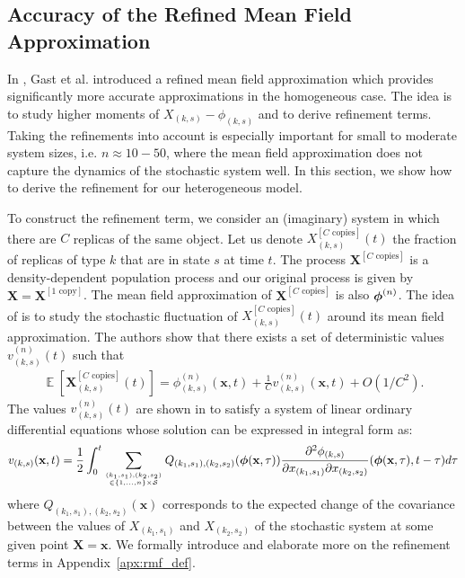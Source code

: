 \documentclass[acmsmall]{acmart}
\newcommand\bx{\mathbf{x}}
\newcommand\bX{\mathbf{X}}
\newcommand\bphi{\text{\boldmath$\phi$}}
\newcommand\calS{\mathcal{S}}
\newcommand\toN{^{(n)}}
\newcommand{\ncopies}{^{[C\text{ copies}]}}
\newcommand{\onecopy}{^{[1\text{ copy}]}}
\DeclareMathOperator{\E}{\mathbb{E}} %
\newcommand\esp[1]{\E\left[#1\right]} %
\newcommand{\dd}[3]{ \frac{\partial^2 #1 }{ \partial x_{#2} \partial x_{#3}}}
\begin{document}
\subsection{Accuracy of the Refined Mean Field Approximation}
\label{ssec:rmf:definition}
\color{myorange}
In \cite{gastSizeExpansionsMean2019,gastRefinedMeanField2017}, Gast et al. introduced a refined mean field approximation which provides significantly more accurate approximations in the homogeneous case. The idea is to study higher moments of $X_{(k,s)} - \phi_{(k,s)}$ and to derive refinement terms. Taking the refinements into account is especially important for small to moderate system sizes, i.e. $n\approx10-50$, where the mean field approximation does not capture the dynamics of the stochastic system well. In this section, we show how to derive the refinement for our heterogeneous model.

To construct the refinement term, we consider an (imaginary) system in which there are $C$ replicas of the same object. Let us denote $X\ncopies_{(k,s)}(t)$ the fraction of replicas of type $k$ that are in state $s$ at time $t$. The process $\mathbf{X}\ncopies$ is a density-dependent population process and our original process is given by $\bX=\bX\onecopy$. The mean field approximation of $\bX\ncopies$ is also $\bphi\toN$.  The idea of \cite{gastSizeExpansionsMean2019} is to study the stochastic fluctuation of $X\ncopies_{(k,s)}(t)$ around its mean field approximation. The authors show that there exists a set of deterministic values $v\toN_{(k,s)}(t)$ such that
\begin{align}
  \label{eq:rmf_Ncopies}
  \esp{\mathbf{X}\ncopies_{(k,s)}(t)} = \phi\toN_{(k,s)}(\bx,t) + \frac1C v\toN_{(k,s)}(\bx,t) + O(1/C^2).
\end{align}
The values $v\toN_{(k,s)}(t)$ are shown in \cite{gastSizeExpansionsMean2019} to satisfy a system of linear ordinary differential equations whose solution can be expressed in integral form as:
\begin{align*}
v_{(k,s)}(\bx, t) = \frac{1}{2}\int_0^t\sum_{(k_1,s_1),(k_2,s_2)\atop \in \{1,\hdots,n\}\times \calS} Q_{(k_1,s_1),(k_2,s_2)}(\bphi(\bx,\tau))\dd{\phi_{(k,s)}}{(k_1,s_1)}{(k_2,s_2)}(\bphi(\bx,\tau),t-\tau)d\tau
\end{align*}
where $Q_{(k_1,s_1),(k_2,s_2)}(\bx)$ corresponds to the expected change of the covariance between the values of $X_{(k_1,s_1)}$ and $X_{(k_2,s_2)}$ of the stochastic system at some given point $\bX = \bx$. We formally introduce and elaborate more on the refinement terms in Appendix~\ref{apx:rmf_def}.
\end{document}
